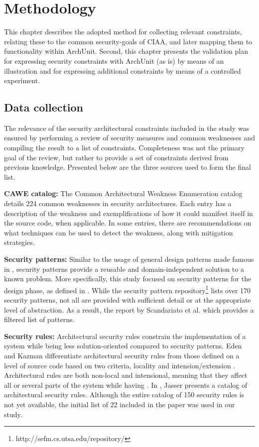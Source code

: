 \chapter{Methodology}

This chapter describes the adopted method for collecting relevant constraints, relating these to the common security-goals of CIAA, and later mapping them to functionality within ArchUnit. Second, this chapter presents the validation plan for expressing security constraints with ArchUnit (as is) by means of an illustration and for expressing additional constraints by means of a controlled experiment.

\section{Data collection}\label{sec:data_collection}

The relevance of the security architectural constraints included in the study was ensured by performing a review of security measures and common weaknesses and compiling the result to a list of constraints. Completeness was not the primary goal of the review, but rather to provide a set of constraints derived from previous knowledge. Presented below are the three sources used to form the final list. 

\textbf{CAWE catalog:}
The Common Architectural Weakness Enumeration catalog \cite{santos_catalog_2017} details 224 common weaknesses in security architectures. Each entry has a description of the weakness and exemplifications of how it could manifest itself in the source code, when applicable. In some entries, there are recommendations on what techniques can be used to detect the weakness, along with mitigation strategies.

\textbf{Security patterns:}
Similar to the usage of general design patterns made famous in \cite{gamma_design_1995}, security patterns provide a reusable and domain-independent solution to a known problem. More specifically, this study focused on security patterns for the design phase, as defined in \cite{yoshioka_survey_2008}. While the security pattern repository\footnote{http://sefm.cs.utsa.edu/repository/} lists over 170 security patterns, not all are provided with sufficient detail or at the appropriate level of abstraction. As a result, the report by Scandariato et al. \cite{scandariato_system_2006}  which provides a filtered list of patterns.


\textbf{Security rules:} \label{subsec:security_rules}
Architectural security rules constrain the implementation of a system while being less solution-oriented compared to security patterns. Eden and Kazman differentiate architectural security rules from those defined on a level of source code based on two criteria, locality and intension/extension \cite{eden_architecture_2003}. Architectural rules are both non-local and intensional, meaning that they affect all or several parts of the system while having . In \cite{franch_constraining_2019}, Jasser presents a catalog of architectural security rules. Although the entire catalog of 150 security rules is not yet available, the initial list of 22 included in the paper was used in our study.

